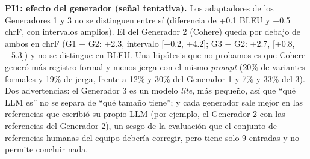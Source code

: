 \documentclass[11pt,a4paper]{article}
\begin{document}
\textbf{PI1: efecto del generador (señal tentativa).} Los adaptadores de los Generadores 1 y 3 no se distinguen entre sí (diferencia de +0.1 BLEU y $-$0.5 chrF, con intervalos amplios). El del Generador 2 (Cohere) queda por debajo de ambos en chrF (G1 $-$ G2: +2.3, intervalo [+0.2, +4.2]; G3 $-$ G2: +2.7, [+0.8, +5.3]) y no se distingue en BLEU. Una hipótesis que no probamos es que Cohere generó más registro formal y menos jerga con el mismo \textit{prompt} (20\% de variantes formales y 19\% de jerga, frente a 12\% y 30\% del Generador 1 y 7\% y 33\% del 3). Dos advertencias: el Generador 3 es un modelo \textit{lite}, más pequeño, así que ``qué LLM es'' no se separa de ``qué tamaño tiene''; y cada generador sale mejor en las referencias que escribió su propio LLM (por ejemplo, el Generador 2 con las referencias del Generador 2), un sesgo de la evaluación que el conjunto de referencias humanas del equipo debería corregir, pero tiene solo 9 entradas y no permite concluir nada.
\end{document}
